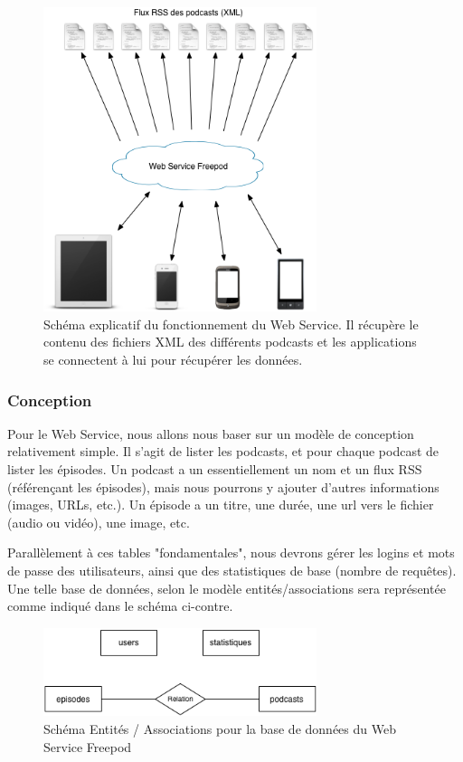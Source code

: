 \documentclass[11pt, french]{report}
\begin{document}
\begin{figure}[!h]
	\begin{center}
	\includegraphics[width=8cm]{schema_webserv.png}
	\caption{\small{Schéma explicatif du fonctionnement du Web Service. Il récupère le contenu des fichiers XML des différents podcasts et les applications se connectent à lui pour récupérer les données.}} \label{webserv}
	\end{center}
\end{figure}

\subsubsection{Conception}

Pour le Web Service, nous allons nous baser sur un modèle de conception relativement simple. Il s'agit de lister les podcasts, et pour chaque podcast de lister les épisodes. Un podcast a un essentiellement un nom et un flux RSS (référençant les épisodes), mais nous pourrons y ajouter d'autres informations (images, URLs, etc.). Un épisode a un titre, une durée, une url vers le fichier (audio ou vidéo), une image, etc.

Parallèlement à ces tables "fondamentales", nous devrons gérer les logins et mots de passe des utilisateurs, ainsi que des statistiques de base (nombre de requêtes). Une telle base de données, selon le modèle entités/associations sera représentée comme indiqué dans le schéma ci-contre.

\begin{figure}[!h]
	\begin{center}
	\includegraphics[width=8cm]{schema_entite_assoc.png}
	\caption{\small{Schéma Entités / Associations pour la base de données du Web Service Freepod}} \label{entiteAssoc}
	\end{center}
\end{figure}
\end{document}
